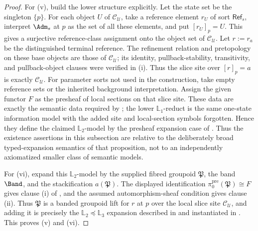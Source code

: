 \begin{proof}
For \textup{(v)}, build the lower structure explicitly. Let the state set be
the singleton $\{p\}$. For each object $U$ of $\mathcal C_{\mathcal U}$, take a
reference element $r_U$ of sort $\mathsf{Ref}_s$, interpret $\Adm_s$ at $p$ as
the set of all these elements, and put $[r_U]_p=U$. This gives a surjective
reference-class assignment onto the object set of $\mathcal C_{\mathcal U}$.
Let $r:=r_a$ be the distinguished terminal reference. The refinement relation
and pretopology on these base objects are those of
$\mathcal C_{\mathcal U}$; its identity, pullback-stability, transitivity, and
pullback-object clauses were verified in \textup{(i)}. Thus the slice site over
$[r]_p=a$ is exactly $\mathcal C_{\mathcal U}$. For parameter sorts not used in
the construction, take empty reference sets or the inherited background
interpretation. Assign the given functor $F$ as the presheaf of local sections on
that slice site. These data are exactly the semantic data required by
;
the lower $\mathbb L_1$-reduct is the same one-state information model with
the added site and local-section symbols forgotten. Hence they define the
claimed $\mathbb L_2$-model by the presheaf expansion case of
. Thus the existence
assertions in this subsection are relative to the deliberately broad
typed-expansion semantics of that proposition, not to an
independently axiomatized smaller class of semantic models.

For \textup{(vi)}, expand this $\mathbb L_2$-model by the supplied fibred
groupoid $\mathfrak P$, the band $\Band$, and the stackification
$a(\mathfrak P)$. The displayed identification
$\pi_0^{\mathrm{pre}}(\mathfrak P)\cong F$ gives clause \textup{(i)} of
, and the assumed automorphism-sheaf condition
gives clause \textup{(ii)}. Thus $\mathfrak P$ is a banded groupoid lift for
$r$ at $p$ over the local slice site $\mathcal C_{\mathcal U}$, and adding it
is precisely the $\mathbb L_2\preceq\mathbb L_3$ expansion described in
 and instantiated in
. This proves \textup{(v)} and \textup{(vi)}.
\end{proof}

